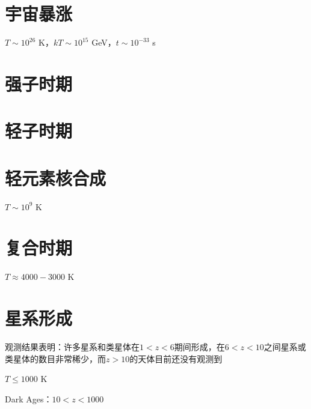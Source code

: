 \documentclass[12pt,a4paper]{article}
\begin{document}
\section{宇宙暴涨}
$T \sim 10^{26}$ K，$kT \sim 10^{15}$ GeV，$t \sim 10^{-33}$ s


\section{强子时期}


\section{轻子时期}

\section{轻元素核合成}
$T \sim 10^{9}$ K


\section{复合时期}
$T \approx 4000 - 3000$ K



\section{星系形成}

观测结果表明：许多星系和类星体在$1<z<6$期间形成，在$6<z<10$之间星系或类星体的数目非常稀少，而$z>10$的天体目前还没有观测到


$T \leq 1000$ K

Dark Ages：$10 < z < 1000$











\end{document}
